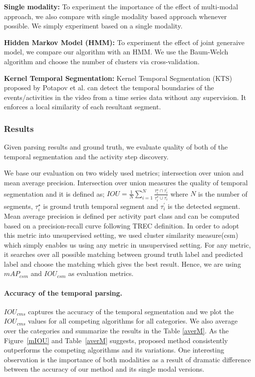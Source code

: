 \noindent\textbf{Single modality:}
To experiment the importance of the effect of multi-modal approach, we also compare with single modality based approach whenever possible. We simply experiment based on a single modality.

\noindent\textbf{Hidden Markov Model (HMM):}
To experiment the effect of joint generaive model, we compare our algorithm with an HMM. We use the Baum-Welch algorithm\cite{rabiner} and choose the number of clusters via cross-validation.


\noindent\textbf{Kernel Temporal Segmentation\cite{potapov2014category}:}
Kernel Temporal Segmentation (KTS) proposed by Potapov et al.\cite{potapov2014category} can detect the temporal boundaries of the events/activities in the video from a time series data without any supervision. It enforces a local similarity of each resultant segment.

\subsubsection{Results}
Given parsing results and ground truth, we evaluate quality of both of the temporal segmentation and the activity step discovery. 

We base our evaluation on two widely used metrics; intersection over union and mean average precision. Intersection over union measures the quality of temporal segmentation and it is defined as; $IOU=\frac{1}{N}\sum_{i=1}^N \frac{\tau^\star_i \cap \tau^\prime_{i}}{\tau^\star_i \cup \tau^\prime_{i}}$ where $N$ is the number of segments, $\tau^\star_i$ is ground truth temporal segment and $\tau^\prime_{i}$ is the detected segment. Mean average precision is defined per activity part class and can be computed based on a precision-recall curve following TREC\cite{THUMOS14} definition. In order to adopt this metric into unsupervised setting, we used cluster similarity measure(csm)\cite{liao05} which simply enables us using any metric in unsupervised setting. For any metric, it searches over all possible matching between ground truth label and predicted label and choose the matching which gives the best result. Hence, we are using $mAP_{csm}$ and $IOU_{csm}$ as evaluation metrics.


\paragraph{Accuracy of the temporal parsing.}
$IOU_{cms}$ captures the accuracy of the temporal segmentation and we plot the $IOU_{cms}$ values for all competing algorithms for all categories. We also average over the categories and summarize the results in the Table \ref{averM}. As the Figure~\ref{mIOU} and Table~\ref{averM} suggests, proposed method consistently outperforms the competing algorithms and its variations. One interesting observation is the importance of both modalities as a result of dramatic difference between the accuracy of our method and its single modal versions.


